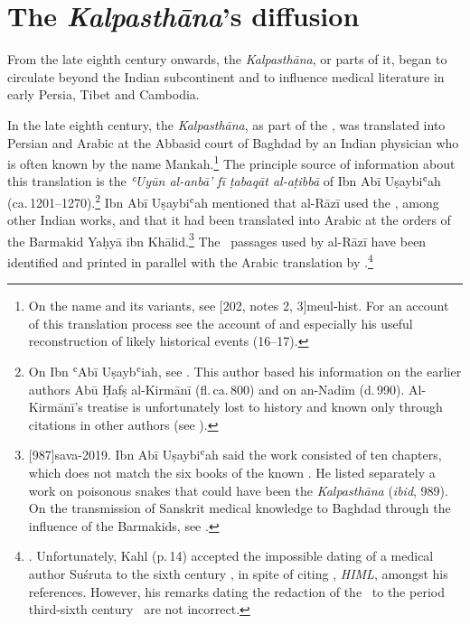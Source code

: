 \section{The \emph{Kalpasthāna}'s diffusion}

From the late eighth century onwards, the \emph{Kalpasthāna}, or parts
of it, began to circulate beyond the Indian subcontinent and to
influence medical literature in early Persia, Tibet and Cambodia.

In the late eighth century, the \emph{Kalpasthāna}, as part of the
\SS, was translated into Persian and Arabic at the Abbasid court of
Baghdad by an Indian physician who is often known by the name
Mankah.\footnote{On the name and its variants, see [202,
    notes 2, 3]{meul-hist}. For an account of this translation process see
    the account of \citet[14--18]{kahl-2015} and especially his useful
    reconstruction of likely historical events (16--17).}  The principle
    source of information about this translation is the \emph{ʿUyūn
        al-anbā' fī ṭabaqāt al-aṭibbā} of Ibn Abī Uṣaybiʿah
    (ca.\,1201--1270).\footnote{On Ibn ʿAbī Uṣaybʿiah, see
        \cite{hill-2019}. This author based his information on the earlier
        authors  Abū Ḥafṣ al-Kirmānī (fl.\,ca.\,800) and on an-Nadīm
        (d.\,990). Al-Kirmānī's treatise is unfortunately lost to history and
        known only through citations in other authors (see
        \cite{bosw-1994,blad-2011}).} Ibn Abī Uṣaybiʿah mentioned that al-Rāzī
        used the \SS, among other Indian works, and that it had been
        translated into Arabic at the orders of the Barmakid Yaḥyā ibn
        Khālid.\footnote{[987]{sava-2019}. Ibn Abī Uṣaybiʿah said
            the work consisted of ten chapters, which does not match the six books
            of the known \SS.  He listed separately a work on poisonous snakes
            that could have been the \emph{Kalpasthāna} (\emph{ibid}, 989).  On
            the transmission of Sanskrit medical knowledge to Baghdad through the
            influence of the Barmakids, see
            \cites{blad-2011}{shef-2013}{kahl-2015}{wuja-2016a}.}  The \SS\
            passages used by al-Rāzī have been identified and printed in parallel
            with the Arabic translation by
            \citeauthor{kahl-2015}.\footnote{\cite[76--82]{kahl-2015}.
                Unfortunately, Kahl (p.\,14) accepted the impossible dating of a
                medical author Suśruta to the sixth century \BCE, in spite of citing
                \citeauthor{meul-hist}, \emph{HIML}, amongst his references. However,
                his remarks dating the redaction of the \SS\ to the period third-sixth
                century \CE\ are not incorrect.}
                
